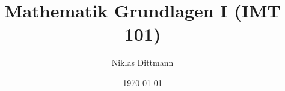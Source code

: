 \documentclass[a4paper,10pt]{article}
\begin{document}
\title{Mathematik Grundlagen I (IMT 101)}
\author{Niklas Dittmann}
\date{\today}
\maketitle




\tableofcontents











\end{document}
